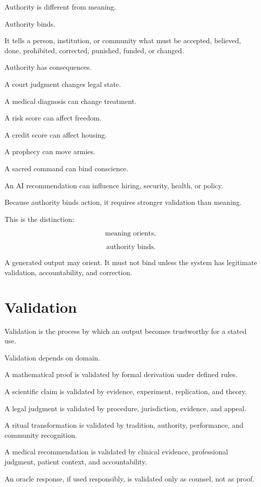 \documentclass[11pt]{book}
\begin{document}
Authority is different from meaning.

Authority binds.

It tells a person, institution, or community what must be accepted, believed, done, prohibited, corrected, punished, funded, or changed.

Authority has consequences.

A court judgment changes legal state.

A medical diagnosis can change treatment.

A risk score can affect freedom.

A credit score can affect housing.

A prophecy can move armies.

A sacred command can bind conscience.

An AI recommendation can influence hiring, security, health, or policy.

Because authority binds action, it requires stronger validation than meaning.

This is the distinction:

\[
\text{meaning orients},
\]

\[
\text{authority binds}.
\]

A generated output may orient. It must not bind unless the system has legitimate validation, accountability, and correction.

\section{Validation}

Validation is the process by which an output becomes trustworthy for a stated use.

Validation depends on domain.

A mathematical proof is validated by formal derivation under defined rules.

A scientific claim is validated by evidence, experiment, replication, and theory.

A legal judgment is validated by procedure, jurisdiction, evidence, and appeal.

A ritual transformation is validated by tradition, authority, performance, and community recognition.

A medical recommendation is validated by clinical evidence, professional judgment, patient context, and accountability.

An oracle response, if used responsibly, is validated only as counsel, not as proof.
\end{document}
